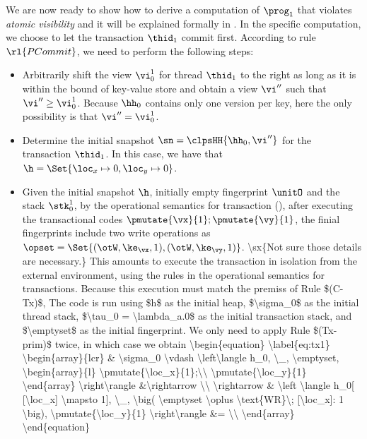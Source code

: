 We are now ready to show how to derive a computation of $\prog_1$ that violates \emph{atomic visibility} and it will be explained formally in .
In the specific computation, we choose to let the transaction $\thid_1$ commit first.
According to rule $\rl{PCommit}$, we need to perform the following steps: 
\begin{itemize}
\item
Arbitrarily shift the view $\vi_{0}^{1}$ for thread $\thid_1$ to the right as long as it is within the bound of key-value store and obtain a view \(\vi'' \) such that \( \vi'' \geq \vi_{0}^{1} \). 
Because $\hh_0$ contains only one version per key, here the only possibility is that $\vi'' = \vi_{0}^{1}$.
\item
Determine the initial snapshot $\sn = \clpsHH{\hh_0, \vi''}$ for the transaction $\thid_1$.
In this case, we have that $\h = \Set{\loc_x \mapsto 0, \loc_y \mapsto 0}$.
\item 
Given the initial snapshot \( \h \), initially empty fingerprint \( \unitO \) and the stack \( \stk_{0}^{1}\), by the operational semantics for transaction (), after executing the transactional codes \( \pmutate{\vx}{1}; \pmutate{\vy}{1} \), the finial fingerprints include two write operations as $\opset = \Set{(\otW, \ke_{\vx}, 1), (\otW, \ke_{\vy}, 1)}$.
\ac{
\sx{Not sure those details are necessary.}
This amounts to execute the transaction in isolation from the external environment, using the rules in the operational semantics for 
 transactions. Because this execution must match the premiss of Rule $(C-Tx)$,  The code is run using $h$ as the initial heap, $\sigma_0$ as the initial 
 thread stack, $\tau_0 = \lambda_a.0$ as the initial transaction stack, and $\emptyset$ as the 
 initial fingerprint. We only need to apply 
 Rule $(Tx-prim)$ twice, in which case we obtain
 \begin{equation}
\label{eq:tx1}
\begin{array}{lcr}
& \sigma_0 \vdash \left\langle h_0, \_, \emptyset, \begin{array}{l}
\pmutate{\loc_x}{1};\\ \pmutate{\loc_y}{1} \end{array} \right\rangle 
&\rightarrow \\
\rightarrow & 
\left \langle h_0[ [\loc_x] \mapsto 1], \_, \big( \emptyset \oplus \text{WR}\; [\loc_x]: 1 \big), 
\pmutate{\loc_y}{1} \right\rangle &= \\

\end{array}
\end{equation}}
\end{itemize}
